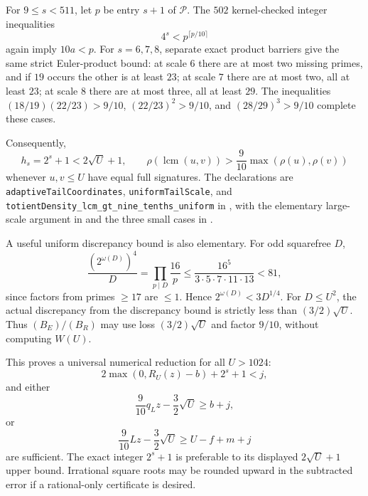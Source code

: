 For $9\le s<511$, let $p$ be entry $s+1$ of $\mathcal P$. The $502$ kernel-checked integer inequalities
\[
 4^s<p^{\lceil p/10\rceil}
\]
again imply $10a<p$. For $s=6,7,8$, separate exact product barriers give the same strict Euler-product bound: at scale $6$ there are at most two missing primes, and if $19$ occurs the other is at least $23$; at scale $7$ there are at most two, all at least $23$; at scale $8$ there are at most three, all at least $29$. The inequalities $(18/19)(22/23)>9/10$, $(22/23)^2>9/10$, and $(28/29)^3>9/10$ complete these cases.

Consequently,
\[
 h_s=2^s+1<2\sqrt U+1,\qquad
 \rho(\operatorname{lcm}(u,v))>\frac9{10}\max(\rho(u),\rho(v))
\]
whenever $u,v\le U$ have equal full signatures. The declarations are \texttt{adaptiveTailCoordinates}, \texttt{uniformTailScale}, and \texttt{totientDensity\_lcm\_gt\_nine\_tenths\_uniform} in , with the elementary large-scale argument in  and the three small cases in .

A useful uniform discrepancy bound is also elementary. For odd squarefree $D$,
\[
\frac{(2^{\omega(D)})^4}{D}
=\prod_{p\mid D}\frac{16}{p}
\le\frac{16^5}{3\cdot5\cdot7\cdot11\cdot13}<81,
\]
since factors from primes $\ge17$ are $\le1$. Hence $2^{\omega(D)}<3D^{1/4}$.
For $D\le U^2$, the actual discrepancy from the discrepancy bound is strictly less than $(3/2)\sqrt U$. Thus $(B_E)/(B_R)$ may use loss $(3/2)\sqrt U$ and factor $9/10$, without computing $W(U)$.

This proves a universal numerical reduction for all $U>1024$:
\[
2\max(0,R_U(z)-b)+2^s+1<j,
\]
and either
\[
\frac9{10}q_Lz-\frac32\sqrt U\ge b+j,
\]
or
\[
\frac9{10}Lz-\frac32\sqrt U\ge U-f+m+j
\]
are sufficient. The exact integer $2^s+1$ is preferable to its displayed $2\sqrt U+1$ upper bound. Irrational square roots may be rounded upward in the subtracted error if a rational-only certificate is desired.

